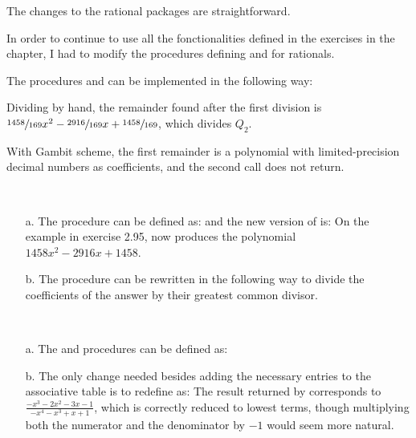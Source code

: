 \begin{exe}[2.93]
    The changes to the rational packages are straightforward.

    \begin{comp}
        In order to continue to use all the fonctionalities defined in the 
        exercises in the chapter, I had to modify the procedures defining 
         and  for rationals.
    \end{comp}
\end{exe}

\begin{exe}[2.94]
    The procedures  and  can be implemented 
    in the following way:
\end{exe}

\begin{exe}[2.95]
    Dividing by hand, the remainder found after the first division is
    $\sfrac{1458}{169} x^2 - \sfrac{2916}{169} x + \sfrac{1458}{169}$, which 
    divides $Q_2$.

    With Gambit scheme, the first remainder is a polynomial with 
    limited-precision decimal numbers as coefficients, and the second call does not 
    return.
\end{exe}

\begin{exe}[2.96]
    \ \vspace{-20pt}
    \begin{itemize}
        \item[a.] The procedure  can be defined as:
            and the new version of  is:
            On the example in exercise 2.95,  now 
            produces the polynomial $1458 x^2 - 2916 x + 1458$.
        \item[b.] The procedure can be rewritten in the following way to divide 
            the coefficients of the answer by their greatest common divisor.
    \end{itemize}
\end{exe}

\begin{exe}[2.97]
    \ \vspace{-20pt}
    \begin{itemize}
        \item[a.] The  and  procedures can 
            be defined as:
        \item[b.] The only change needed besides adding the necessary entries to 
            the associative table is to redefine  as:
            The result returned by  corresponds to
            $\frac{-x^3 - 2x^2 - 3x - 1}{-x^4 - x^3 + x + 1}$, which is 
            correctly reduced to lowest terms, though multiplying both the 
            numerator and the denominator by $-1$ would seem more natural.
    \end{itemize}
\end{exe}
